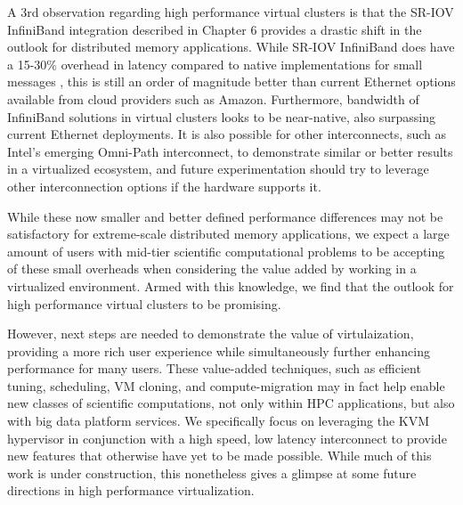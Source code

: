 A 3rd observation regarding high performance virtual clusters is that the SR-IOV InfiniBand integration described in Chapter 6 provides a drastic shift in the outlook for distributed memory applications.  While SR-IOV InfiniBand does have a 15-30\% overhead in latency compared to native implementations for small messages \cite{Musleh2014cloud}, this is still an order of magnitude better than current Ethernet options available from cloud providers such as Amazon. Furthermore, bandwidth of InfiniBand solutions in virtual clusters looks to be near-native, also surpassing current Ethernet deployments.  It is also possible for other interconnects, such as Intel's emerging Omni-Path interconnect, to demonstrate similar or better results in a virtualized ecosystem, and future experimentation should try to leverage other interconnection options if the hardware supports it.  

While these now smaller and better defined performance differences may not be satisfactory for extreme-scale distributed memory applications, we expect a large amount of users with mid-tier scientific computational problems to be accepting of these small overheads when considering the value added by working in a virtualized environment. Armed with this knowledge, we find that the outlook for high performance virtual clusters to be promising.  

However, next steps are needed to demonstrate the value of virtulaization, providing a more rich user experience while simultaneously further enhancing performance for many users.  These value-added techniques, such as efficient tuning, scheduling, VM cloning, and compute-migration may in fact help enable new classes of scientific computations, not only within HPC applications, but also with big data platform services. We specifically focus on leveraging the KVM hypervisor in conjunction with a high speed, low latency interconnect to provide new features that otherwise have yet to be made possible.  While much of this work is under construction, this nonetheless gives a glimpse at some future directions in high performance virtualization.     



